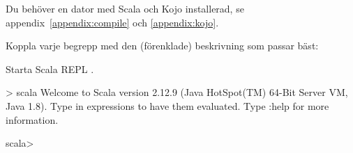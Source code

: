 
\ifPreSolution
\Exercise{\ExeWeekONE}\label{exe:W01}

\begin{Goals}

\end{Goals}

\begin{Preparations}
\item {}
\item Du behöver en dator med Scala och Kojo installerad, se appendix~\ref{appendix:compile} och  \ref{appendix:kojo}.
\end{Preparations}

\else

\ExerciseSolution{\ExeWeekONE}

\fi  %


\BasicTasks





\QUESTBEGIN

\Task \what

\vspace{1em}\noindent Koppla varje begrepp med den (förenklade) beskrivning som passar bäst:

\begin{ConceptConnections}

\end{ConceptConnections}

\SOLUTION

\TaskSolved \what

\begin{ConceptConnections}

\end{ConceptConnections}

\QUESTEND







\QUESTBEGIN

\Task \what

\vspace{1em}\noindent Starta Scala REPL .

\begin{REPLnonum}
> scala
Welcome to Scala version 2.12.9 (Java HotSpot(TM) 64-Bit Server VM, Java 1.8).
Type in expressions to have them evaluated.
Type :help for more information.

scala>
\end{REPLnonum}

